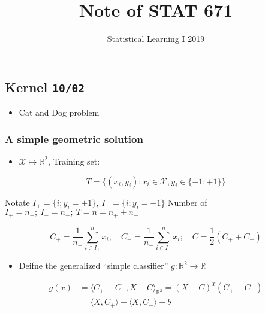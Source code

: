 \documentclass[10pt,portrait]{article}
\title{Note of STAT 671}
\subtitle{Statistical Learning I 2019}
\author{}
\date{}
\providecommand{\tightlist}{%
  \setlength{\itemsep}{0pt}\setlength{\parskip}{0pt}}
\begin{document}
\maketitle

{
\setcounter{tocdepth}{4}
\tableofcontents
}
\hypertarget{section}{%
\section{}\label{section}}

\hypertarget{kernel-1002}{%
\subsection{\texorpdfstring{Kernel
\texttt{10/02}}{Kernel 10/02}}\label{kernel-1002}}

\begin{itemize}
\tightlist
\item
  Cat and Dog problem
\end{itemize}

\hypertarget{a-simple-geometric-solution}{%
\subsubsection{A simple geometric
solution}\label{a-simple-geometric-solution}}

\begin{itemize}
\tightlist
\item
  \(\mathcal{X}\mapsto\mathbb{R}^2\), Training set:
\end{itemize}

\[T=\{(x_i,y_i);x_i\in\mathcal{X},y_i\in\{-1;+1\}\}\]

Notate \(I_+=\{i;y_i=+1\},\ I_-=\{i;y_i=-1\}\) Number of
\(I_+=n_+;\ I_-=n_-;\ T=n=n_++n_-\)

\[C_+=\frac1{n_{+}}\sum\limits_{i\in I_+}^n x_i;\quad C_-=\frac1{n_{-}}\sum\limits_{i\in I_-}^n x_i;\quad C=\frac1{2}(C_++C_-)\]

\begin{itemize}
\tightlist
\item
  Deifne the generalized ``simple classifier''
  \(g: \mathbb{R}^2\to\mathbb{R}\)
\end{itemize}

\begin{eqnarray*}
g(x)&=\langle C_+-C_-,X-C\rangle_{\mathbb{R}^2}=(X-C)^T(C_+-C_-)\\
    &=\langle X,C_+\rangle-\langle X,C_-\rangle+b
\end{eqnarray*}
\end{document}
